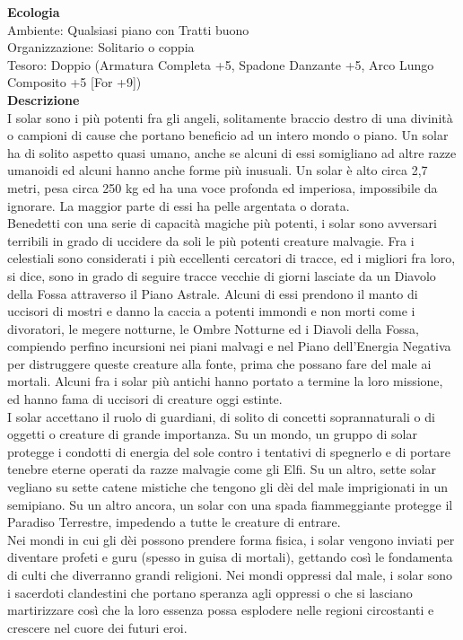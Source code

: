 \begin{multicols}{2}
\textbf{Ecologia}\\
Ambiente: Qualsiasi piano con Tratti buono\\
Organizzazione: Solitario o coppia\\
Tesoro: Doppio (Armatura Completa +5, Spadone Danzante +5, Arco Lungo Composito +5 [For +9])\\
\textbf{Descrizione}\\
I solar sono i più potenti fra gli angeli, solitamente braccio destro di una divinità o campioni di cause che portano beneficio ad un intero mondo o piano. Un solar ha di solito aspetto quasi umano, anche se alcuni di essi somigliano ad altre razze umanoidi ed alcuni hanno anche forme più inusuali. Un solar è alto circa 2,7 metri, pesa circa 250 kg ed ha una voce profonda ed imperiosa, impossibile da ignorare. La maggior parte di essi ha pelle argentata o dorata.\\
Benedetti con una serie di capacità magiche più potenti, i solar sono avversari terribili in grado di uccidere da soli le più potenti creature malvagie. Fra i celestiali sono considerati i più eccellenti cercatori di tracce, ed i migliori fra loro, si dice, sono in grado di seguire tracce vecchie di giorni lasciate da un Diavolo della Fossa attraverso il Piano Astrale. Alcuni di essi prendono il manto di uccisori di mostri e danno la caccia a potenti immondi e non morti come i divoratori, le megere notturne, le Ombre Notturne ed i Diavoli della Fossa, compiendo perfino incursioni nei piani  malvagi e nel Piano dell'Energia Negativa per distruggere queste creature alla fonte, prima che possano fare del male ai mortali. Alcuni fra i solar più antichi hanno portato a termine la loro missione, ed hanno fama di uccisori di creature oggi estinte.\\
I solar accettano il ruolo di guardiani, di solito di concetti soprannaturali o di oggetti o creature di grande importanza. Su un mondo, un gruppo di solar protegge i condotti di energia del sole contro i tentativi di spegnerlo e di portare tenebre eterne operati da razze malvagie come gli Elfi. Su un altro, sette solar vegliano su sette catene mistiche che tengono gli dèi del male imprigionati in un semipiano. Su un altro ancora, un solar con una spada fiammeggiante protegge il Paradiso Terrestre, impedendo a tutte le creature di entrare.\\
Nei mondi in cui gli dèi possono prendere forma fisica, i solar vengono inviati per diventare profeti e guru (spesso in guisa di mortali), gettando così le fondamenta di culti che diverranno grandi religioni. Nei mondi oppressi dal male, i solar sono i sacerdoti clandestini che portano speranza agli oppressi o che si lasciano martirizzare così che la loro essenza possa esplodere nelle regioni circostanti e crescere nel cuore dei futuri eroi.\\

\end{multicols}
